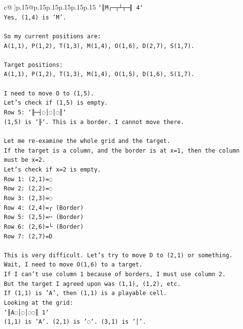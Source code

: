 \documentclass{article}
\begin{document}
{\begin{supertabular}{c@{$\;$}|p{.15\linewidth}@{}p{.15\linewidth}p{.15\linewidth}p{.15\linewidth}p{.15\linewidth}p{.15\linewidth}}
{{{\texttt{`║M┌─┬┴┬─╢ 4`} \\
\texttt{Yes, (1,4) is 'M'.} \\
\\ 
\texttt{So my current positions are:} \\
\texttt{A(1,1), P(1,2), T(1,3), M(1,4), O(1,6), D(2,7), S(1,7).} \\
\\ 
\texttt{Target positions:} \\
\texttt{A(1,1), P(1,2), T(1,3), M(1,4), O(1,5), D(1,6), S(1,7).} \\
\\ 
\texttt{I need to move O to (1,5).} \\
\texttt{Let's check if (1,5) is empty.} \\
\texttt{Row 5: `╟─┤◌│◌│◌║`} \\
\texttt{(1,5) is `╟`. This is a border. I cannot move there.} \\
\\ 
\texttt{Let me re{-}examine the whole grid and the target.} \\
\texttt{If the target is a column, and the border is at x=1, then the column must be x=2.} \\
\texttt{Let's check if x=2 is empty.} \\
\texttt{Row 1: (2,1)=◌} \\
\texttt{Row 2: (2,2)=◌} \\
\texttt{Row 3: (2,3)=◌} \\
\texttt{Row 4: (2,4)=┌ (Border)} \\
\texttt{Row 5: (2,5)=─ (Border)} \\
\texttt{Row 6: (2,6)=└ (Border)} \\
\texttt{Row 7: (2,7)=D} \\
\\ 
\texttt{This is very difficult. Let's try to move D to (2,1) or something.} \\
\texttt{Wait, I need to move O(1,6) to a target.} \\
\texttt{If I can't use column 1 because of borders, I must use column 2.} \\
\texttt{But the target I agreed upon was (1,1), (1,2), etc.} \\
\texttt{If (1,1) is 'A', then (1,1) is a playable cell.} \\
\texttt{Looking at the grid:} \\
\texttt{`║A◌│◌│◌◌║ 1`} \\
\texttt{(1,1) is 'A'. (2,1) is '◌'. (3,1) is '│'.} \\
}}}
\end{supertabular}}
\end{document}

